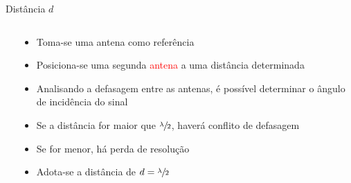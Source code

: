     \begin{frame}{Distância $d$}
                \begin{columns}
            \begin{column}{0.45\textwidth}
                \centering \vfill
                \vfill
                \visible<5->{}\vfill
                \vfill
            \end{column}
            \begin{column}{0.55\textwidth}
                \begin{itemize}[<+(-1)->]
                    \item Toma-se uma \textcolor{cmyk_B}{antena} como referência
                    \item Posiciona-se uma segunda \textcolor{Red}{antena} a uma distância determinada
                    \item Analisando a defasagem entre as antenas, é possível determinar o ângulo de incidência do sinal
                    \item Se a distância for maior que $\sfrac{\lambda}{2}$, haverá conflito de defasagem
                    \item Se for menor, há perda de resolução
                    \item Adota-se a distância de $d = \sfrac{\lambda}{2}$
                \end{itemize}
            \end{column}
        \end{columns}
    \end{frame}

